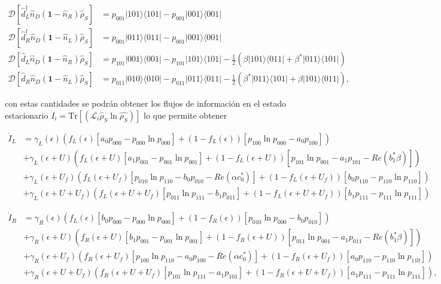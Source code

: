\begin{appendixs}
\begin{align*}
    \mathcal{D}[\hat{d}^{\dagger}_{L}\hat{n}_{D}(\textbf{1}-\hat{n}_{R})\hat{\rho}_{S}] & = p_{001}|101\rangle \langle 101| - p_{001}|001\rangle \langle 001| \\ 
    \mathcal{D}[\hat{d}^{\dagger}_{R}\hat{n}_{D}(\textbf{1}-\hat{n}_{L})\hat{\rho}_{S}] & = p_{001}|011\rangle \langle 011| - p_{001}|001\rangle \langle 001| \\  
    \mathcal{D}[\hat{d}_{L}\hat{n}_{D}(\textbf{1}-\hat{n}_{R})\hat{\rho}_{S}] & = p_{101}|001\rangle \langle 001| - p_{101}|101\rangle \langle 101| - \frac{1}{2}(\beta |101\rangle \langle 011| + \beta^{*}|011\rangle \langle 101| ) \\ 
    \mathcal{D}[\hat{d}_{R}\hat{n}_{D}(\textbf{1}-\hat{n}_{L})\hat{\rho}_{S}] & = p_{011}|010\rangle \langle 010| - p_{011}|011\rangle \langle 011| - \frac{1}{2}(\beta^{*} |011\rangle \langle 101| + \beta|101\rangle \langle 011|  ),   
\end{align*}

con estas cantidades se podrán obtener los flujos de información en el estado estacionario $\dot{I}_{i} = \text{Tr}[(\mathcal{L}_{i}\hat{\rho}_{S} \ln \hat{\rho_{S}}) ]$ lo que permite obtener

\begin{align*}
    \dot{I}_{L} &  =  \gamma_{L}(\epsilon)(f_{L}(\epsilon)[a_{0}p_{000} - p_{000}\ln p_{000}] + (1-f_{L}(\epsilon))[p_{100}\ln p_{000} - a_{0}p_{100} ] )  \\ 
      & + \gamma_{L}(\epsilon + U)(f_{L}(\epsilon + U)[a_{1}p_{001} - p_{001}\ln p_{001}] + (1-f_{L}(\epsilon + U))[p_{101}\ln p_{001} -a_{1}p_{101} - Re(b^{*}_{1}\beta ) ]   ) \\  
      & + \gamma_{L}(\epsilon + U_{f})( f_{L}(\epsilon + U_{f})[p_{010}\ln p_{110} -b_{0}p_{010} - Re(\alpha c^{*}_{0}) ]  + (1-f_{L}(\epsilon + U_{f}))[b_{0}p_{110} - p_{110}\ln p_{110} ] ) \\  
      & + \gamma_{L}(\epsilon + U + U_{f})( f_{L}(\epsilon + U + U_{f})[p_{011}\ln p_{111}- b_{1}p_{011}] + (1-f_{L}(\epsilon+U+U_{f}) )[b_{1}p_{111} - p_{111}\ln p_{111}]  ) 
\end{align*}

\begin{align*}
    \dot{I}_{R} &  =  \gamma_{R}(\epsilon)(f_{L}(\epsilon)[b_{0}p_{000} - p_{000}\ln p_{000}] + (1-f_{R}(\epsilon))[p_{010}\ln p_{000} - b_{0}p_{010} ] )  \\ 
      & + \gamma_{R}(\epsilon + U)(f_{R}(\epsilon + U)[b_{1} p_{001} - p_{001}\ln p_{001}] + (1-f_{R}(\epsilon + U))[p_{011}\ln p_{001} -a_{1}p_{011} - Re(b^{*}_{1}\beta ) ]   ) \\  
      & + \gamma_{R}(\epsilon + U_{f})( f_{R}(\epsilon + U_{f})[p_{100}\ln p_{110} -a_{0}p_{100} - Re(\alpha c^{*}_{0}) ]  + (1-f_{R}(\epsilon + U_{f}))[a_{0}p_{110} - p_{110}\ln p_{110} ] ) \\  
      & + \gamma_{R}(\epsilon + U + U_{f})( f_{R}(\epsilon + U + U_{f})[p_{101}\ln p_{111}- a_{1}p_{101}] + (1-f_{R}(\epsilon+U+U_{f}) )[a_{1}p_{111} - p_{111}\ln p_{111}]  ), 
\end{align*}


\end{appendixs}
